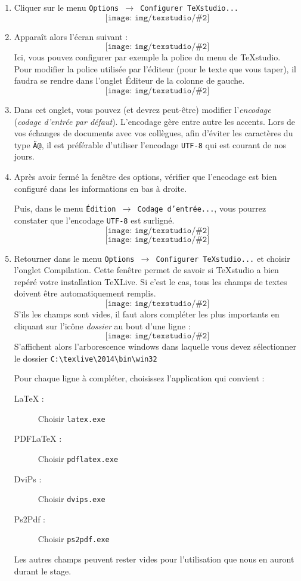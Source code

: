 \documentclass[10pt,openright,oneside,french]{book}
\newcommand{\texlive}{\TeX {\sf Live}\xspace}
\newcommand{\texstudio}{{\sf TeXstudio}\xspace}
\newcommand{\texstudioimg}[2][0.5]{\[\texttt{[image: img/texstudio/\#2]}\]}
\begin{document}
\begin{enumerate}
	\item Cliquer sur le menu {\tt Options $\rightarrow$ Configurer TeXstudio...}
		\texstudioimg[0.75]{TeXstudio_menu_options}
	\item Apparaît alors l'écran suivant :
		\texstudioimg[1]{TeXstudio_config_general}
	Ici, vous pouvez configurer par exemple la police du menu de \texstudio. Pour modifier la police utilisée par l'éditeur (pour le texte que vous taper), il faudra se rendre dans l'onglet {\sf \'Editeur} de la colonne de gauche.
		\texstudioimg[1]{TeXstudio_config_editeur}
	\item Dans cet onglet, vous pouvez (et devrez peut-être) modifier l'\textit{encodage} (\textit{codage d'entrée par défaut}). L'encodage gère entre autre les accents. Lors de vos échanges de documents avec vos collègues, afin d'éviter les caractères du type {\tt Ã}\verb|@|, il est préférable d'utiliser l'encodage {\tt UTF-8} qui est courant de nos jours.
	\item Après avoir fermé la fenêtre des options, vérifier que l'encodage est bien configuré dans les informations en bas à droite.\par
        Puis, dans le menu {\tt \'Edition $\rightarrow$ Codage d'entrée...}, vous pourrez constater que l'encodage {\tt UTF-8} est surligné.
	    	\texstudioimg[0.5]{TeXstudio_fin_ligne_type}
	    	\texstudioimg[0.5]{TeXstudio_encodage}
    \item Retourner dans le menu {\tt Options $\rightarrow$ Configurer TeXstudio...} et choisir l'onglet {\sf Compilation}. Cette fenêtre permet de savoir si \texstudio a bien repéré votre installation \texlive. Si c'est le cas, tous les champs de textes doivent être automatiquement remplis.
            \texstudioimg[0.5]{TeXstudio_config_compilation}
        S'ils les champs sont vides, il faut alors compléter les plus importants en cliquant sur l'icône \textit{dossier} au bout d'une ligne :
            \texstudioimg[1]{TeXstudio_config_compilation_detail}
        S'affichent alors l'arborescence windows dans laquelle vous devez sélectionner le dossier \verb+C:\texlive\2014\bin\win32+\par
        Pour chaque ligne à compléter, choisissez l'application qui convient :
        \begin{description}
            \item[LaTeX :] Choisir \verb+latex.exe+
            \item[PDFLaTeX :] Choisir \verb+pdflatex.exe+
            \item[DviPs :] Choisir \verb+dvips.exe+
            \item[Ps2Pdf :] Choisir \verb+ps2pdf.exe+
        \end{description}
        Les autres champs peuvent rester vides pour l'utilisation que nous en auront durant le stage.
    \end{enumerate}
\end{document}
